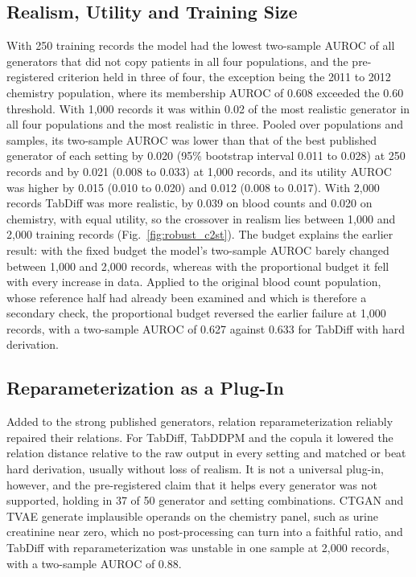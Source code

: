 \documentclass[conference]{IEEEtran}
\begin{document}
\subsection*{Realism, Utility and Training Size}

With 250 training records the model had the lowest two-sample AUROC of all generators that did not copy patients in all four populations, and the pre-registered criterion held in three of four, the exception being the 2011 to 2012 chemistry population, where its membership AUROC of 0.608 exceeded the 0.60 threshold. With 1,000 records it was within 0.02 of the most realistic generator in all four populations and the most realistic in three. Pooled over populations and samples, its two-sample AUROC was lower than that of the best published generator of each setting by 0.020 (95\% bootstrap interval 0.011 to 0.028) at 250 records and by 0.021 (0.008 to 0.033) at 1,000 records, and its utility AUROC was higher by 0.015 (0.010 to 0.020) and 0.012 (0.008 to 0.017). With 2,000 records TabDiff was more realistic, by 0.039 on blood counts and 0.020 on chemistry, with equal utility, so the crossover in realism lies between 1,000 and 2,000 training records (Fig.~\ref{fig:robust_c2st}). The budget explains the earlier result: with the fixed budget the model's two-sample AUROC barely changed between 1,000 and 2,000 records, whereas with the proportional budget it fell with every increase in data. Applied to the original blood count population, whose reference half had already been examined and which is therefore a secondary check, the proportional budget reversed the earlier failure at 1,000 records, with a two-sample AUROC of 0.627 against 0.633 for TabDiff with hard derivation.

\subsection*{Reparameterization as a Plug-In}

Added to the strong published generators, relation reparameterization reliably repaired their relations. For TabDiff, TabDDPM and the copula it lowered the relation distance relative to the raw output in every setting and matched or beat hard derivation, usually without loss of realism. It is not a universal plug-in, however, and the pre-registered claim that it helps every generator was not supported, holding in 37 of 50 generator and setting combinations. CTGAN and TVAE generate implausible operands on the chemistry panel, such as urine creatinine near zero, which no post-processing can turn into a faithful ratio, and TabDiff with reparameterization was unstable in one sample at 2,000 records, with a two-sample AUROC of 0.88.
\end{document}
